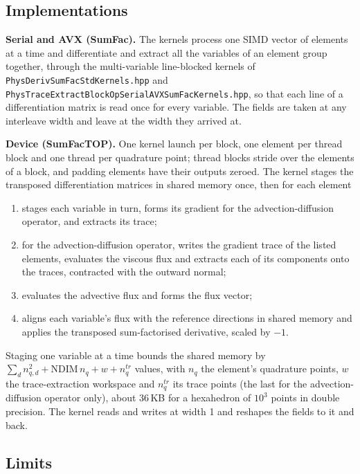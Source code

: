 \subsection{Implementations}

\textbf{Serial and AVX (SumFac).} The kernels process one SIMD vector of
elements at a time and differentiate and extract all the variables of an
element group together, through the multi-variable line-blocked kernels of
\texttt{PhysDerivSumFacStdKernels.hpp} and
\texttt{PhysTraceExtractBlockOpSerialAVXSumFacKernels.hpp}, so that each
line of a differentiation matrix is read once for every variable. The
fields are taken at any interleave width and leave at the width they
arrived at.

\textbf{Device (SumFacTOP).} One kernel launch per block, one element per
thread block and one thread per quadrature point; thread blocks stride over
the elements of a block, and padding elements have their outputs zeroed.
The kernel stages the transposed differentiation matrices in shared memory
once, then for each element
\begin{enumerate}
  \item stages each variable in turn, forms its gradient for the
    advection-diffusion operator, and extracts its trace;
  \item for the advection-diffusion operator, writes the gradient trace of
    the listed elements, evaluates the viscous flux and extracts each of
    its components onto the traces, contracted with the outward normal;
  \item evaluates the advective flux and forms the flux vector;
  \item aligns each variable's flux with the reference directions in
    shared memory and applies the transposed sum-factorised derivative,
    scaled by $-1$.
\end{enumerate}
Staging one variable at a time bounds the shared memory by
$\sum_d n_{q,d}^2 + \mathrm{NDIM}\, n_q + w + n_q^{tr}$ values, with $n_q$
the element's quadrature points, $w$ the trace-extraction workspace and
$n_q^{tr}$ its trace points (the last for the advection-diffusion operator
only), about 36\,KB for a hexahedron of $10^3$ points in double precision.
The kernel reads and writes at width 1 and reshapes the fields to it and
back.

\subsection{Limits}

